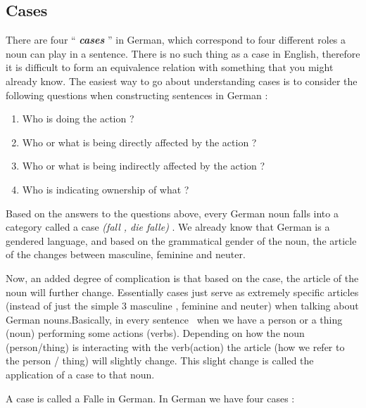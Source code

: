 \documentclass[a4paper,twocolumn,10pt]{article}
\newcommand{\newpar}
{\par \vspace{0.3cm}}
\newcommand{\subsectionend}
{
\nolinenumbers
\linenumbers
}
\begin{document}


\subsectionend

\subsection{Cases}
\label{ssec:cases}

There are four ``{ \textbf{\textit{cases}} }'' in German, which correspond to
four different roles a noun can play in a sentence.  There is no such thing as a
case in English, therefore it is difficult to form an equivalence relation with
something that you might already know. The easiest way to go about understanding
cases is to consider the following questions when constructing sentences in
German :

\nolinenumbers
\begin{enumerate}[noitemsep]
	\item Who is doing the action ?
	\item Who or what is being directly affected by the action ?
	\item Who or what is being indirectly affected by the action ?
	\item Who is indicating ownership of what ?
\end{enumerate}
\linenumbers

Based on the answers to the questions above, every German noun falls into a
category called a case \textit{(fall , die falle)} . We already know that German
is a gendered language, and based on the grammatical gender of the noun, the
article of the changes between masculine, feminine and neuter.\newpar

Now, an added degree of complication is that based on the case, the article of
the noun will further change. Essentially cases just serve as extremely specific
articles (instead of just the simple 3 masculine , feminine and neuter) when
talking about German nouns.Basically, in every sentence  when we have a person
or a thing (noun) performing some actions (verbs). Depending on how the noun
(person/thing) is interacting with the verb(action) the article (how we refer to
the person / thing) will slightly change. This slight change is called the
application of a case to that noun.\newpar

A case is called a Falle in German.  In German we have four cases :

\nolinenumbers
\end{document}

